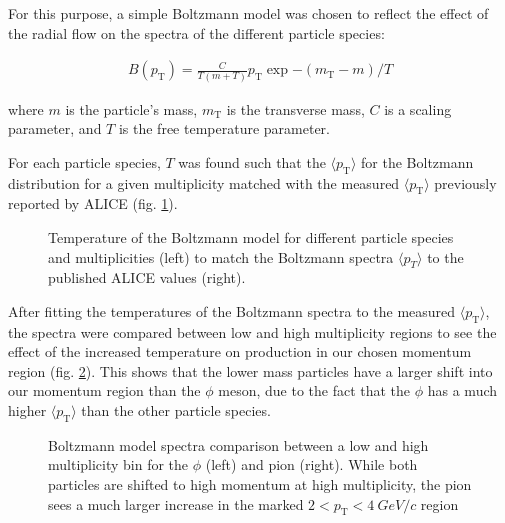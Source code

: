 \documentclass[ALICE,manyauthors]{ALICE_analysis_notes}
\begin{document}
\begin{itemize}
For this purpose, a simple Boltzmann model was chosen to reflect the effect of the radial flow on the spectra of the different particle species:

\begin{align}
    B(p_{\text{T}}) = \frac{C}{T(m+T)}p_{\text{T}}\exp{-(m_{\text{T}}-m)/T}
\end{align}

where $m$ is the particle's mass, $m_{\text{T}}$ is the transverse mass, $C$ is a scaling parameter, and $T$ is the free temperature parameter.

For each particle species, $T$ was found such that the $\langle p_{\text{T}}\rangle$ for the Boltzmann distribution for a given multiplicity matched with the measured $\langle p_{\text{T}}\rangle$ previously reported by ALICE (fig. \ref{mean_pt}).

\begin{figure}[ht]
\centering
\begin{subfigure}{
\texttt{[image: images/addendum/boltz/boltz\_temp.png]}
}
\end{subfigure}
\begin{subfigure}{
\texttt{[image: images/addendum/boltz/pub\_meanpt.png]}
}
\end{subfigure}
\caption{Temperature of the Boltzmann model for different particle species and multiplicities (left) to match the Boltzmann spectra $\langle p_{T}\rangle$ to the published ALICE values (right).}
\label{mean_pt}
\end{figure}

After fitting the temperatures of the Boltzmann spectra to the measured $\langle p_{\text{T}} \rangle$, the spectra were compared between low and high multiplicity regions to see the effect of the increased temperature on production in our chosen momentum region (fig. \ref{boltzspectra}).  This shows that the lower mass particles have a larger shift into our momentum region than the $\phi$ meson, due to the fact that the $\phi$ has a much higher $\langle p_{\text{T}} \rangle$ than the other particle species.

\begin{figure}[ht]
\centering
\begin{subfigure}{
\texttt{[image: images/addendum/boltz/boltz\_phispectra.png]}
}
\end{subfigure}
\begin{subfigure}{
\texttt{[image: images/addendum/boltz/boltz\_pispectra.png]}
}
\end{subfigure}
\caption{Boltzmann model spectra comparison between a low and high multiplicity bin for the $\phi$ (left) and pion (right). While both particles are shifted to high momentum at high multiplicity, the pion sees a much larger increase in the marked $2 < p_{\text{T}} < \SI{4}{GeV/c}$ region}
\label{boltzspectra}
\end{figure}


\end{itemize}
\end{document}
